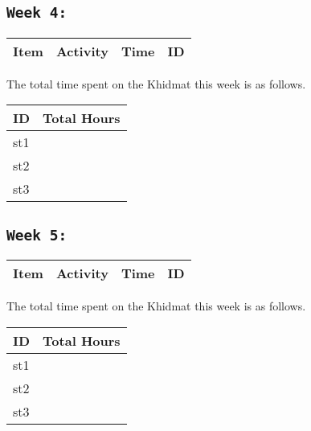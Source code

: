 \documentclass{article}
\begin{document}
\subsection{\texttt{Week 4: }}
\begin{center}
\begin{tabular}{|l|l|l|l|}
  \hline
  \textbf{Item} 	& \textbf{Activity} & \textbf{Time} & \textbf{ID} \\\hline
  
\end{tabular}
    
\end{center}
The total time spent on the Khidmat this week is as follows.    
\begin{center}
    
\begin{tabular}{|l|l|}
  \hline
  \textbf{ID} & \textbf{Total Hours}\\\hline
  st1 & \\\hline
  st2 & \\\hline
  st3 & \\\hline
\end{tabular}
\end{center}
\newpage
\subsection{\texttt{Week 5: }}
\begin{center}
\begin{tabular}{|l|l|l|l|}
  \hline
  \textbf{Item} 	& \textbf{Activity} & \textbf{Time} & \textbf{ID} \\\hline
  
\end{tabular}
    
\end{center}
The total time spent on the Khidmat this week is as follows.    
\begin{center}
    
\begin{tabular}{|l|l|}
  \hline
  \textbf{ID} & \textbf{Total Hours}\\\hline
  st1 & \\\hline
  st2 & \\\hline
  st3 & \\\hline
\end{tabular}
\end{center}
\newpage
\end{document}
